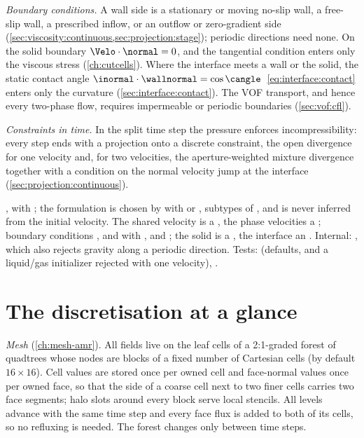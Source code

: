 \emph{Boundary conditions.} A wall side is a stationary or moving no-slip
wall, a free-slip wall, a prescribed inflow, or an outflow or zero-gradient
side (\cref{sec:viscosity:continuous,sec:projection:stage}); periodic
directions need none. On the solid boundary $\Velo\cdot\normal=0$, and the
tangential condition enters only the viscous stress (\cref{ch:cutcells}).
Where the interface meets a wall or the solid, the static contact angle
$\inormal\cdot\wallnormal=\cos\cangle$~\cref{eq:interface:contact} enters
only the curvature (\cref{sec:interface:contact}). The VOF transport, and
hence every two-phase flow, requires impermeable or periodic boundaries
(\cref{sec:vof:cfl}).

\emph{Constraints in time.} In the split time step the pressure enforces
incompressibility: every step ends with a projection onto a discrete
constraint, the open divergence for one velocity and, for two velocities,
the aperture-weighted mixture divergence together with a condition on the
normal velocity jump at the interface (\cref{sec:projection:continuous}).

\begin{implnote}
,
with ; the formulation is chosen by
with  or , subtypes of
, and is never inferred from the initial
velocity. The shared velocity is a , the phase
velocities a ; boundary conditions ,
 and  with
,  and ; the
solid is a , the interface an .
Internal: , which also rejects
gravity along a periodic direction. Tests:
(defaults, and a liquid/gas initializer rejected with one velocity),
.
\end{implnote}

\section{The discretisation at a glance}\label{sec:overview:glance}
\emph{Mesh} (\cref{ch:mesh-amr}). All fields live on the leaf cells of a
2:1-graded forest of quadtrees whose nodes are blocks of a fixed number of
Cartesian cells (by default $16\times16$). Cell values are stored once per
owned cell and face-normal values once per owned face, so that the side of a
coarse cell next to two finer cells carries two face segments; halo slots
around every block serve local stencils. All levels advance with the same
time step and every face flux is added to both of its cells, so no
refluxing is needed. The forest changes only between time steps.


